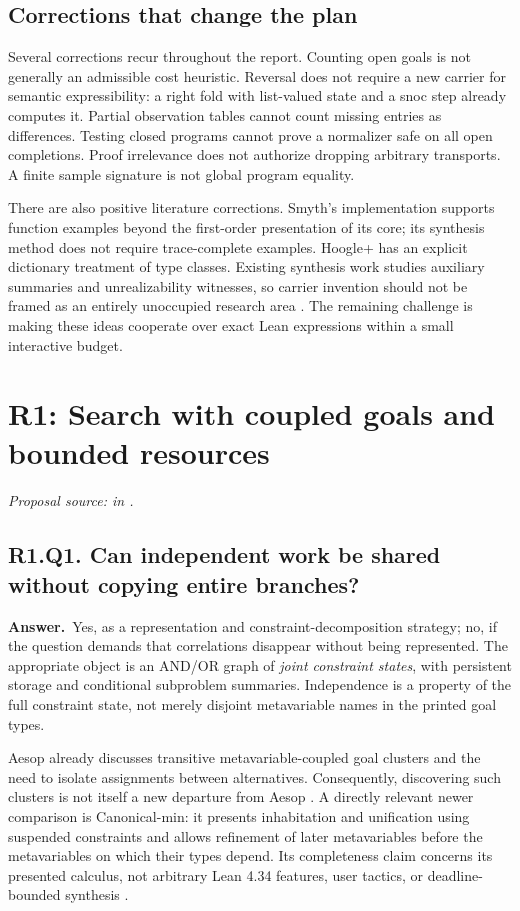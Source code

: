 \documentclass[11pt,a4paper]{article}
\theoremstyle{definition}
\theoremstyle{remark}
\newcommand{\answer}{\par\noindent\textbf{Answer.}\ }
\newcommand{\sourcepart}[1]{\par\noindent\textit{Proposal source: #1 in \cite{proposal}.}}
\newcommand{\qheading}[2]{\subsection{#1. #2}}
\begin{document}
\subsection{Corrections that change the plan}
Several corrections recur throughout the report. Counting open goals is not
generally an admissible cost heuristic. Reversal does not require a new carrier
for semantic expressibility: a right fold with list-valued state and a snoc
step already computes it. Partial observation tables cannot count missing
entries as differences. Testing closed programs cannot prove a normalizer safe
on all open completions. Proof irrelevance does not authorize dropping arbitrary
transports. A finite sample signature is not global program equality.

There are also positive literature corrections. Smyth's implementation
supports function examples beyond the first-order presentation of its core;
its synthesis method does not require trace-complete examples. Hoogle+ has an
explicit dictionary treatment of type classes. Existing synthesis work studies
auxiliary summaries and unrealizability witnesses, so carrier invention should
not be framed as an entirely unoccupied research area
\cite{smyth,hoogle,autolifter,synduce}. The remaining challenge is making these
ideas cooperate over exact Lean expressions within a small interactive budget.

\section{R1: Search with coupled goals and bounded resources}
\label{sec:r1}
\sourcepart{}

\qheading{R1.Q1}{Can independent work be shared without copying entire branches?}
\answer Yes, as a representation and constraint-decomposition strategy; no,
if the question demands that correlations disappear without being represented.
The appropriate object is an AND/OR graph of \emph{joint constraint states},
with persistent storage and conditional subproblem summaries. Independence is
a property of the full constraint state, not merely disjoint metavariable
names in the printed goal types.

Aesop already discusses transitive metavariable-coupled goal clusters and the
need to isolate assignments between alternatives. Consequently, discovering
such clusters is not itself a new departure from Aesop \cite{aesop}. A directly
relevant newer comparison is Canonical-min: it presents inhabitation and
unification using suspended constraints and allows refinement of later
metavariables before the metavariables on which their types depend. Its
completeness claim concerns its presented calculus, not arbitrary Lean 4.34
features, user tactics, or deadline-bounded synthesis \cite{canonicalmin}.
\end{document}
